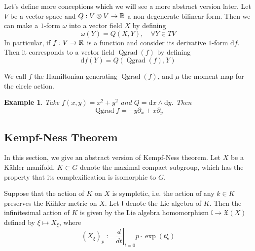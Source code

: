 \documentclass[11pt]{amsart}
\numberwithin{equation}{section}
\theoremstyle{plain}
\theoremstyle{plain}
\newtheorem{exsub}[thmsub]{Example}
\numberwithin{equation}{section}
\begin{document}
Let's define more conceptions which we will see a more abstract version later. Let $V$ be a vector space and $Q:V\otimes V\to\Bbb{R}$ a non-degenerate bilinear form. Then we can make a $1$-form $\omega$ into a vector field $X$ by defining
$$
\omega(Y)=Q(X,Y),\quad\forall Y\in TV
$$
In particular, if $f:V\to\Bbb{R}$ is a function and consider its derivative $1$-form $\mathrm{d}f$. Then it corresponds to a vector field $\operatorname{Qgrad}(f)$ by defining
$$
\mathrm{d}f(Y)=Q(\operatorname{Qgrad}(f),Y)
$$

We call $f$ the Hamiltonian generating $\operatorname{Qgrad}(f)$, and $\mu$ the moment map for the circle action.
\begin{exsub}\normalfont
Take $f(x,y)=x^2+y^2$ and $Q=\mathrm{d}x\wedge\mathrm{d}y$. Then
$$
\operatorname{Qgrad}f=-y\partial_x+x\partial_y
$$
\end{exsub}
\subsection{Kempf-Ness Theorem}
In this section, we give an abstract version of Kempf-Ness theorem. Let $X$ be a Kähler manifold, $K\subset G$ denote the maximal compact subgroup, which has the property that its complexification is isomorphic to $G$. 

Suppose that the action of $K$ on $X$ is sympletic, i.e. the action of any $k\in K$ preserves the Kähler metric on $X$. Let $\mathfrak{l}$ denote the Lie algebra of $K$. Then the infinitesimal action of $K$ is given by the Lie algebra homomorphism $\mathfrak{l}\to\mathfrak{X}(X)$ defined by $\xi\mapsto X_{\xi}$, where
$$
\left(X_{\xi}\right)_{p}:=\left.\frac{d}{d t}\right|_{t=0} p \cdot \exp (t \xi)
$$
\end{document}
